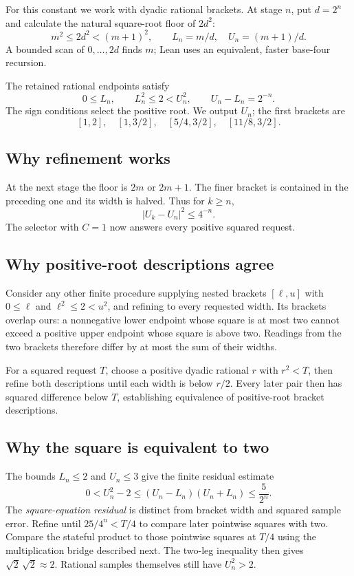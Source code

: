 \documentclass[11pt]{article}
\newcommand{\sq}[1]{\lvert #1\rvert^2}
\begin{document}
For this constant we work with dyadic rational brackets. At stage $n$,
put $d=2^n$ and calculate the natural square-root floor of $2d^2$:
\[
 m^2\leq2d^2<(m+1)^2,\qquad
                  L_n=m/d,\quad U_n=(m+1)/d.
\]
A bounded scan of $0,\ldots,2d$ finds $m$; Lean uses an equivalent,
faster base-four recursion.

The retained rational endpoints satisfy
\[
                0\leq L_n,\qquad L_n^2\leq2<U_n^2,
                \qquad U_n-L_n=2^{-n}.
\]
The sign conditions select the positive root. We output $U_n$; the first
brackets are
\[
 [1,2],\quad[1,3/2],\quad[5/4,3/2],\quad[11/8,3/2].
\]

\subsection*{Why refinement works}

At the next stage the floor is $2m$ or $2m+1$. The finer bracket is
contained in the preceding one and its width is halved. Thus for $k\geq n$,
\[
                         \sq{U_k-U_n}\leq4^{-n}.
\]
The selector with $C=1$ now answers every positive squared request.

\subsection*{Why positive-root descriptions agree}

Consider any other finite procedure supplying nested brackets $[\ell,u]$
with $0\leq\ell$ and $\ell^2\leq2<u^2$, and refining to every requested
width. Its brackets overlap ours: a nonnegative lower endpoint whose
square is at most two cannot exceed a positive upper endpoint whose
square is above two. Readings from the two brackets therefore differ
by at most the sum of their widths.

For a squared request $T$, choose a positive dyadic rational $r$ with
$r^2<T$, then refine both descriptions until each width is below $r/2$.
Every later pair then has squared difference below $T$, establishing
equivalence of positive-root bracket descriptions.

\subsection*{Why the square is equivalent to two}

The bounds $L_n\leq2$ and $U_n\leq3$ give the finite residual estimate
\[
 0<U_n^2-2\leq(U_n-L_n)(U_n+L_n)\leq\frac{5}{2^n}.
\]
The \emph{square-equation residual} is distinct from bracket width and
squared sample error. Refine until $25/4^n<T/4$ to compare later pointwise
squares with two. Compare the stateful product to those pointwise squares
at $T/4$ using the multiplication bridge described next. The two-leg
inequality then gives $\sqrt2\,\sqrt2\approx2$. Rational samples themselves
still have $U_n^2>2$.
\end{document}
